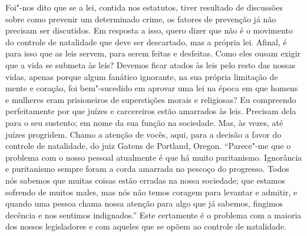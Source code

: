 Foi"-nos dito que se a lei, contida nos estatutos, tiver resultado de
discussões sobre como prevenir um determinado crime, os fatores de
prevenção já não precisam ser discutidos. Em resposta a isso, quero
dizer que não é o movimento do controle de natalidade que deve ser
descartado, mas a própria lei. Afinal, é para isso que as leis servem,
para serem feitas e desfeitas. Como eles ousam exigir que a vida se
submeta às leis? Devemos ficar atados às leis pelo resto das nossas
vidas, apenas porque algum fanático ignorante, na sua própria limitação
de mente e coração, foi bem"-sucedido em aprovar uma lei na época em que
homens e mulheres eram prisioneiros de superstições morais e religiosas?
Eu compreendo perfeitamente por que juízes e carcereiros estão amarrados
às leis. Precisam dela para o seu sustento; em nome da sua função na
sociedade. Mas, às vezes, até juízes progridem. Chamo a atenção de
vocês, aqui, para a decisão a favor do controle de natalidade, do juiz
Gatens de Portland, Oregon. ``Parece"-me que o problema com o nosso
pessoal atualmente é que há muito puritanismo. Ignorância e puritanismo
sempre foram a corda amarrada no pescoço do progresso. Todos nós sabemos
que muitas coisas estão erradas na nossa sociedade; que estamos sofrendo
de muitos males, mas nós não temos coragem para levantar e admitir, e
quando uma pessoa chama nossa atenção para algo que já sabemos, fingimos
decência e nos sentimos indignados.'' Este certamente é o problema com a
maioria dos nossos legisladores e com aqueles que se opõem ao controle
de natalidade.

